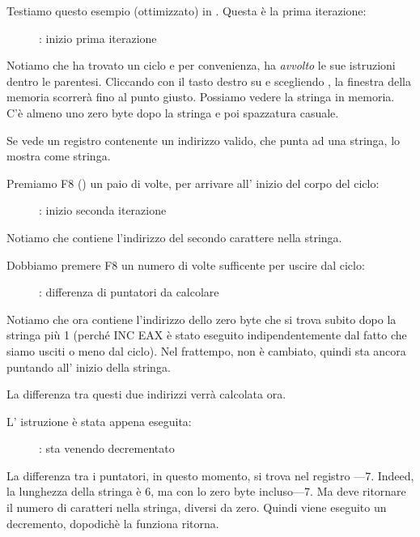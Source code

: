 ﻿\clearpage
{}
\myindex{\olly}

Testiamo questo esempio (ottimizzato) in \olly.  Questa è la prima iterazione:

\begin{figure}[H]
\centering
{}
\caption{\olly: inizio prima iterazione}
\label{fig:strlen_olly_1}
\end{figure}

Notiamo che \olly ha trovato un ciclo e per convenienza, ha \emph{avvolto} le sue istruzioni dentro le parentesi.
Cliccando con il tasto destro su \EAX e scegliendo 
, la finestra della memoria scorrerà fino al punto giusto.
Possiamo vedere la stringa  in memoria.
C'è almeno
uno zero byte dopo la stringa e poi spazzatura casuale.

Se \olly vede un registro contenente un indirizzo valido, che punta ad una stringa,  
lo mostra come stringa.

\clearpage
Premiamo F8 (\stepover) un paio di volte, per arrivare all' inizio del corpo del ciclo:

\begin{figure}[H]
\centering
{}
\caption{\olly: inizio seconda iterazione}
\label{fig:strlen_olly_2}
\end{figure}

Notiamo che \EAX contiene l'indirizzo del secondo carattere nella stringa.

\clearpage

Dobbiamo premere F8 un numero di volte sufficente per uscire dal ciclo:

\begin{figure}[H]
\centering
{}
\caption{\olly: differenza di puntatori da calcolare}
\label{fig:strlen_olly_3}
\end{figure}

Notiamo che ora \EAX contiene l'indirizzo dello zero byte che si trova subito dopo la stringa più 1 (perché INC EAX è stato eseguito indipendentemente dal fatto che siamo usciti o meno dal ciclo).
Nel frattempo, \EDX non è cambiato,
quindi sta ancora puntando all' inizio della stringa.

La differenza tra questi due indirizzi verrà calcolata ora.

\clearpage
L' istruzione \SUB è stata appena eseguita:

\begin{figure}[H]
\centering
{}
\caption{\olly: \EAX  sta venendo decrementato}
\label{fig:strlen_olly_4}
\end{figure}

La differenza tra i puntatori, in questo momento, si trova nel registro \EAX---7.
Indeed, la lunghezza della stringa  è 6, 
ma con lo zero byte incluso---7.
Ma  deve ritornare il numero di caratteri nella stringa, diversi da zero.
Quindi viene eseguito un decremento, dopodichè la funziona ritorna.

